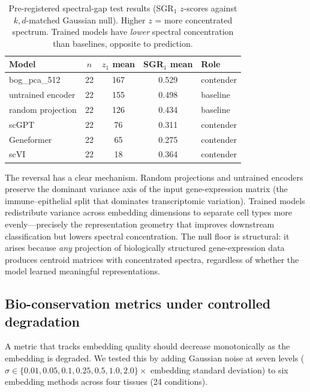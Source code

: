 \documentclass[11pt]{article}
\begin{document}
\begin{table}[t]
\centering
\caption{Pre-registered spectral-gap test results (SGR$_1$ $z$-scores
against $k,d$-matched Gaussian null). Higher $z$ = more concentrated
spectrum. Trained models have \emph{lower} spectral concentration than
baselines, opposite to prediction.}
\label{tab:sgr}
\small
\begin{tabular}{@{}lcccl@{}}
\toprule
Model & $n$ & $z_1$ mean & SGR$_1$ mean & Role \\
\midrule
bog\_pca\_512           & 22 & 167 & 0.529 & contender \\
untrained encoder       & 22 & 155 & 0.498 & baseline \\
random projection       & 22 & 126 & 0.434 & baseline \\
scGPT                   & 22 & 76  & 0.311 & contender \\
Geneformer              & 22 & 65  & 0.275 & contender \\
scVI                    & 22 & 18  & 0.364 & contender \\
\bottomrule
\end{tabular}
\end{table}

The reversal has a clear mechanism. Random projections and untrained
encoders preserve the dominant variance axis of the input gene-expression
matrix (the immune--epithelial split that dominates transcriptomic
variation). Trained models redistribute variance across embedding
dimensions to separate cell types more evenly---precisely the
representation geometry that improves downstream classification but
lowers spectral concentration. The null floor is structural: it
arises because \emph{any} projection of biologically structured
gene-expression data produces centroid matrices with concentrated
spectra, regardless of whether the model learned meaningful
representations.


\subsection{Bio-conservation metrics under controlled degradation}
\label{sec:noise}

A metric that tracks embedding quality should decrease monotonically
as the embedding is degraded. We tested this by adding Gaussian noise at
seven levels ($\sigma \in \{0.01, 0.05, 0.1, 0.25, 0.5, 1.0, 2.0\}
\times$ embedding standard deviation) to six embedding methods across
four tissues (24 conditions).
\end{document}
